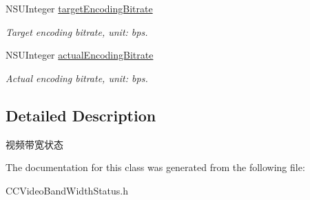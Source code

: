 \begin{DoxyCompactItemize}
N\+S\+U\+Integer \hyperlink{interface_c_c_video_band_width_status_aa4091d323f84d68132c7b91dca2c6d11}{target\+Encoding\+Bitrate}
\begin{DoxyCompactList}\small\item\em Target encoding bitrate, unit\+: bps. \end{DoxyCompactList}\item 
\mbox{\label{interface_c_c_video_band_width_status_a1a68b690b59ccbe087d95bc814083a5c}} 
N\+S\+U\+Integer \hyperlink{interface_c_c_video_band_width_status_a1a68b690b59ccbe087d95bc814083a5c}{actual\+Encoding\+Bitrate}
\begin{DoxyCompactList}\small\item\em Actual encoding bitrate, unit\+: bps. \end{DoxyCompactList}\end{DoxyCompactItemize}


\subsection{Detailed Description}
视频带宽状态 

The documentation for this class was generated from the following file\+:\begin{DoxyCompactItemize}
\item 
C\+C\+Video\+Band\+Width\+Status.\+h\end{DoxyCompactItemize}
